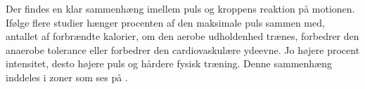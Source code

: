 Der findes en klar sammenhæng imellem puls og kroppens reaktion på motionen. Ifølge flere studier hænger procenten af den maksimale puls sammen med, antallet af forbrændte kalorier, om den aerobe udholdenhed trænes, forbedrer den anaerobe tolerance eller forbedrer den cardiovaskulære ydeevne. Jo højere procent intensitet, desto højere puls og hårdere fysisk træning. Denne sammenhæng inddeles i zoner som ses på . \citep{Leyland2007,Heartratejournal2015}

